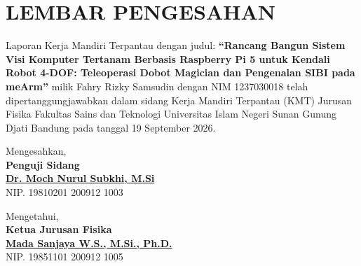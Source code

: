\chapter*{\centering LEMBAR PENGESAHAN}

\vspace{0.5cm}
\noindent Laporan Kerja Mandiri Terpantau dengan judul: \textbf{``Rancang Bangun Sistem Visi Komputer Tertanam Berbasis Raspberry Pi 5 untuk Kendali Robot 4-DOF: Teleoperasi Dobot Magician dan Pengenalan SIBI pada meArm''} milik Fahry Rizky Samsudin dengan NIM 1237030018 telah dipertanggungjawabkan dalam sidang Kerja Mandiri Terpantau (KMT) Jurusan Fisika Fakultas Sains dan Teknologi Universitas Islam Negeri Sunan Gunung Djati Bandung pada tanggal 19 September 2026.

\vspace{1.5cm}
\begin{center}
    Mengesahkan,\\[0.5cm]
    \textbf{Penguji Sidang}\\[2.5cm]
    \textbf{\underline{Dr. Moch Nurul Subkhi, M.Si}}\\
    NIP. 19810201 200912 1003

    \vspace{2cm}
    Mengetahui,\\
    \textbf{Ketua Jurusan Fisika}\\[2.5cm]
    \textbf{\underline{Mada Sanjaya W.S., M.Si., Ph.D.}}\\
    NIP. 19851101 200912 1005
\end{center}
\newpage
